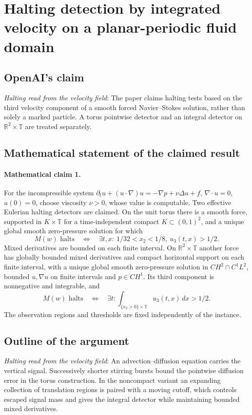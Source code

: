 \documentclass[11pt]{article}
\begin{document}
\section*{Halting detection by integrated velocity on a planar-periodic fluid domain}

\subsection{OpenAI's claim}
\textit{Halting read from the velocity field}: The paper claims halting tests based on the third velocity component of a smooth forced Navier--Stokes solution, rather than solely a marked particle. A torus pointwise detector and an integral detector on $\mathbb R^2\times\mathbb T$ are treated separately.

\subsection{Mathematical statement of the claimed result}
\paragraph{Mathematical claim 1.} For the incompressible system $\partial_tu+(u\cdot\nabla)u=-\nabla p+\nu\Delta u+f$, $\nabla\cdot u=0$, $u(0)=0$, choose viscosity $\nu>0$, whose value is computable. Two effective Eulerian halting detectors are claimed. On the unit torus there is a smooth force, supported in $K\times\mathbb T$ for a time-independent compact $K\subset(0,1)^2$, and a unique global smooth zero-pressure solution for which \[M(w)\text{ halts}\quad\Longleftrightarrow\quad\exists t,x:\ 1/32<x_2<1/8,\ u_3(t,x)>1/2.\] Mixed derivatives are bounded on each finite interval. On $\mathbb R^2\times\mathbb T$ another force has globally bounded mixed derivatives and compact horizontal support on each finite interval, with a unique global smooth zero-pressure solution in $CH^2\cap C^1L^2$, bounded $u,\nabla u$ on finite intervals and $p\in CH^1$. Its third component is nonnegative and integrable, and \[M(w)\text{ halts}\quad\Longleftrightarrow\quad\exists t:\int_{\{x_2>0\}\times\mathbb T}u_3(t,x)\,dx>1/2.\] The observation regions and thresholds are fixed independently of the instance.

\subsection{Outline of the argument}
\textit{Halting read from the velocity field}: An advection--diffusion equation carries the vertical signal. Successively shorter stirring bursts bound the pointwise diffusion error in the torus construction. In the noncompact variant an expanding collection of translation regions is paired with a moving cutoff, which controls escaped signal mass and gives the integral detector while maintaining bounded mixed derivatives.
\end{document}
